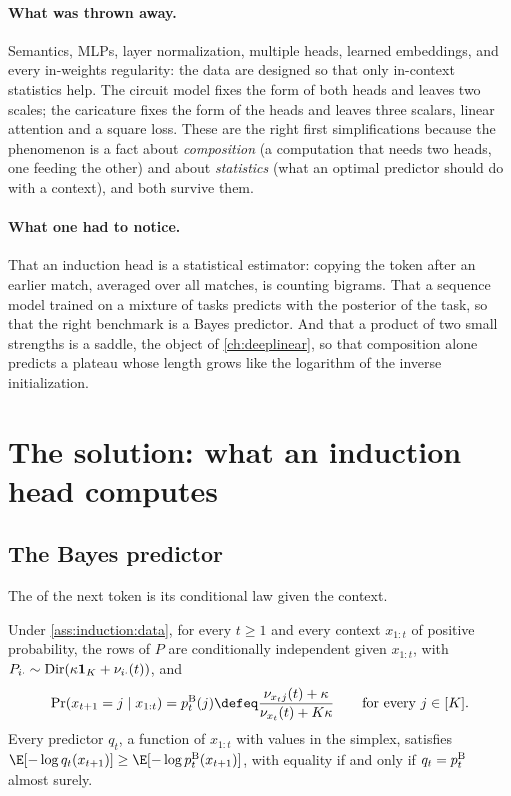 \begin{refsection}
\paragraph{What was thrown away.} Semantics, MLPs, layer normalization, multiple heads, learned embeddings, and every in-weights regularity: the data are designed so that only in-context statistics help. The circuit model fixes the form of both heads and leaves two scales; the caricature fixes the form of the heads and leaves three scalars, linear attention and a square loss. These are the right first simplifications because the phenomenon is a fact about \emph{composition} (a computation that needs two heads, one feeding the other) and about \emph{statistics} (what an optimal predictor should do with a context), and both survive them.

\paragraph{What one had to notice.} That an induction head is a statistical estimator: copying the token after an earlier match, averaged over all matches, is counting bigrams. That a sequence model trained on a mixture of tasks predicts with the posterior of the task, so that the right benchmark is a Bayes predictor. And that a product of two small strengths is a saddle, the object of \cref{ch:deeplinear}, so that composition alone predicts a plateau whose length grows like the logarithm of the inverse initialization.

\section{The solution: what an induction head computes}\label{sec:induction:circuit}

\subsection{The Bayes predictor}

The  of the next token is its conditional law given the context.

\begin{theorem}\label{thm:induction:bayes}
Under \cref{ass:induction:data}, for every $t\ge1$ and every context $x_{1:t}$ of positive probability, the rows of $P$ are conditionally independent given $x_{1:t}$, with $P_{i\cdot}\sim\operatorname{Dir}(\kappa\mathbf1_K+\nu_{i\cdot}(t))$, and
\begin{equation}\label{eq:induction:bayes}
  \Pr(x_{t+1}=j\mid x_{1:t})=\indpb_t(j)\defeq\frac{\indcnt_{x_tj}(t)+\kappa}{\indcnt_{x_t}(t)+K\kappa}\qquad\text{for every }j\in[K].
\end{equation}
Every predictor $q_t$, a function of $x_{1:t}$ with values in the simplex, satisfies $\E[-\log q_t(x_{t+1})]\ge\E[-\log\indpb_t(x_{t+1})]$, with equality if and only if $q_t=p^{\mathrm{B}}_t$ almost surely.
\end{theorem}


\end{refsection}
